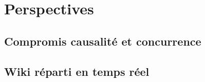 
\section{Perspectives}

\subsection{Compromis causalité et concurrence}

\subsection{Wiki réparti en temps réel}

